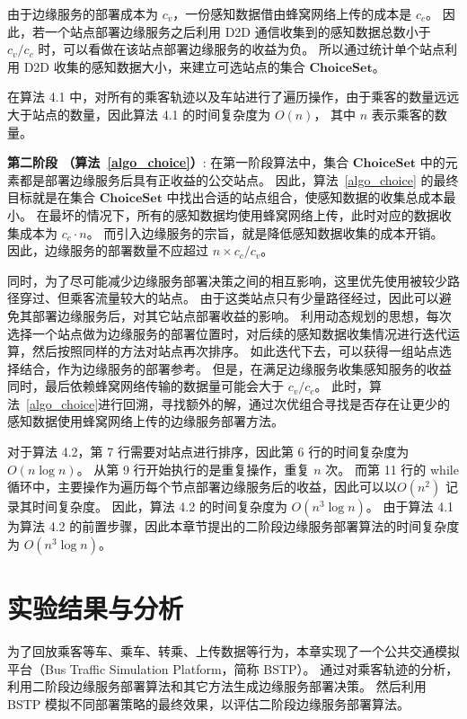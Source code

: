 由于边缘服务的部署成本为 $c_v$，一份感知数据借由蜂窝网络上传的成本是  $c_c$。
因此，若一个站点部署边缘服务之后利用 D2D 通信收集到的感知数据总数小于 $c_v/c_c$ 时，可以看做在该站点部署边缘服务的收益为负。
所以通过统计单个站点利用 D2D 收集的感知数据大小，来建立可选站点的集合 $\boldsymbol{ChoiceSet}$。

在算法 4.1 中，对所有的乘客轨迹以及车站进行了遍历操作，由于乘客的数量远远大于站点的数量，因此算法 4.1 的时间复杂度为 $O(n)$， 其中 $n$ 表示乘客的数量。

\textbf{第二阶段 （算法~\ref{algo_choice}）}:
在第一阶段算法中，集合 $\boldsymbol{ChoiceSet}$ 中的元素都是部署边缘服务后具有正收益的公交站点。
因此，算法~\ref{algo_choice} 的最终目标就是在集合 $\boldsymbol{ChoiceSet}$ 中找出合适的站点组合，使感知数据的收集总成本最小。
在最坏的情况下，所有的感知数据均使用蜂窝网络上传，此时对应的数据收集成本为 $c_c \cdot n$。
而引入边缘服务的宗旨，就是降低感知数据收集的成本开销。
因此，边缘服务的部署数量不应超过 $n\times c_c / c_v$。

同时，为了尽可能减少边缘服务部署决策之间的相互影响，这里优先使用被较少路径穿过、但乘客流量较大的站点。
由于这类站点只有少量路径经过，因此可以避免其部署边缘服务后，对其它站点部署收益的影响。
利用动态规划的思想，每次选择一个站点做为边缘服务的部署位置时，对后续的感知数据收集情况进行迭代运算，然后按照同样的方法对站点再次排序。
如此迭代下去，可以获得一组站点选择结合，作为边缘服务的部署参考。
但是，在满足边缘服务收集感知服务的收益同时，最后依赖蜂窝网络传输的数据量可能会大于 $c_v / c_c$。
此时，算法~\ref{algo_choice}进行回溯，寻找额外的解，通过次优组合寻找是否存在让更少的感知数据使用蜂窝网络上传的边缘服务部署方法。

对于算法 4.2，第 7 行需要对站点进行排序，因此第 6 行的时间复杂度为 $O(n\log{n})$。
从第 9 行开始执行的是重复操作，重复 $n$ 次。
而第 11 行的 while 循环中，主要操作为遍历每个节点部署边缘服务后的收益，因此可以以$O(n^2)$ 记录其时间复杂度。
因此，算法 4.2 的时间复杂度为 $O(n^3\log{n})$。
由于算法 4.1 为算法 4.2 的前置步骤，因此本章节提出的二阶段边缘服务部署算法的时间复杂度为 $O(n^3\log{n})$。

\section{实验结果与分析}

为了回放乘客等车、乘车、转乘、上传数据等行为，本章实现了一个公共交通模拟平台（Bus Traffic Simulation Platform，简称 BSTP）。
通过对乘客轨迹的分析，利用二阶段边缘服务部署算法和其它方法生成边缘服务部署决策。
然后利用 BSTP 模拟不同部署策略的最终效果，以评估二阶段边缘服务部署算法。

